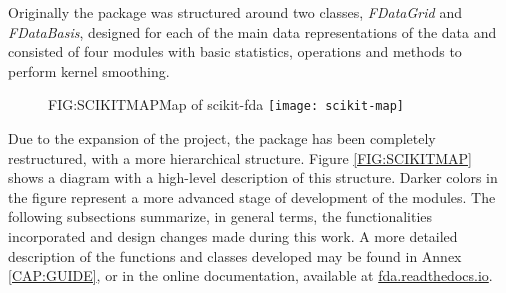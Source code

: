 
Originally the package was structured around two classes, \textit{FDataGrid} and
\textit{FDataBasis}, designed for each of the main data representations of the data and
consisted of four modules with basic statistics, operations and methods to
perform kernel smoothing.

\begin{figure}[Map of scikit-fda]{FIG:SCIKITMAP}{Map of scikit-fda \cite{ramos-carrenoScikitfdaPythonPackage2019}}
	\texttt{[image: scikit-map]}
\end{figure}


Due to the expansion of the project, the package has been completely
restructured, with a more hierarchical structure. Figure \ref{FIG:SCIKITMAP}
shows a diagram with a high-level description of this structure. Darker colors in the figure represent a more advanced stage of development of the modules.
The following
subsections summarize, in general terms, the functionalities incorporated and
design changes made during this work. A more detailed description of the functions and classes developed may be found
in Annex \ref{CAP:GUIDE}, or in the online documentation, available at \href{https://fda.readthedocs.io/}{fda.readthedocs.io}.
